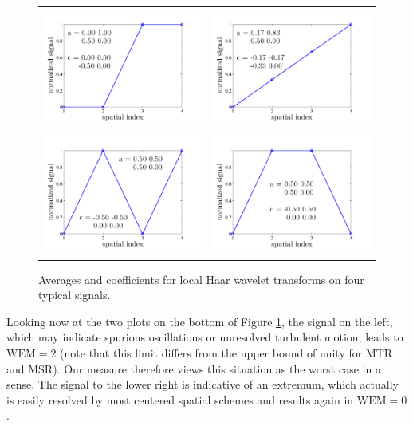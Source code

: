 \documentclass[11pt]{book}
\begin{document}
\begin{figure}[ht]
\centering
\begin{tabular}{rl}
\includegraphics[width=0.4\linewidth]{FIGURES/haar_step} &
\includegraphics[width=0.4\linewidth]{FIGURES/haar_line} \\
\includegraphics[width=0.4\linewidth]{FIGURES/haar_eddy} &
\includegraphics[width=0.4\linewidth]{FIGURES/haar_extr}
\end{tabular}
\vskip-0.2cm
\caption{Averages and coefficients for local Haar wavelet transforms on four typical signals.}
\label{fig_wavelet_transforms}
\end{figure}

Looking now at the two plots on the bottom of Figure \ref{fig_wavelet_transforms}, the signal on the left, which may indicate spurious oscillations or unresolved turbulent motion, leads to $\mbox{WEM} = 2$ (note that this limit differs from the upper bound of unity for MTR and MSR).  Our measure therefore views this situation as the worst case in a sense.  The signal to the lower right is indicative of an extremum, which actually is easily resolved by most centered spatial schemes and results again in $\mbox{WEM}=0$.
\end{document}
